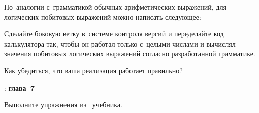 По~аналогии с~грамматикой обычных арифметических выражений, для логических побитовых выражений можно написать следующее:

Сделайте боковую ветку  в~системе контроля версий и переделайте код калькулятора так, чтобы он работал только с~целыми числами и вычислял значения побитовых логических выражений согласно разработанной грамматике.

Как убедиться, что ваша реализация работает правильно?



\WhatToReadSection
\textcite{Stroustrup:2016:ru}: \textbf{глава~7}



\ExercisesSection
\begin{exercise}
\item Выполните упражнения из~ учебника.
\end{exercise}
